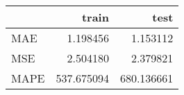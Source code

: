\begin{tabular}{lrr}
\toprule
{} &       train &        test \\
\midrule
MAE  &    1.198456 &    1.153112 \\
MSE  &    2.504180 &    2.379821 \\
MAPE &  537.675094 &  680.136661 \\
\bottomrule
\end{tabular}
